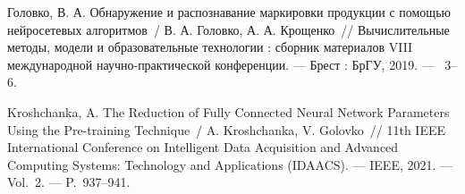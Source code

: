 Головко, В. А. Обнаружение и распознавание маркировки продукции с помощью нейросетевых алгоритмов~/ В. А. Головко, А. А. Крощенко~//
 Вычислительные методы, модели и образовательные технологии : сборник материалов VIII международной научно-практической конференции. ---
\newblock Брест : БрГУ, 2019. ---
~3--6. 

Kroshchanka, A. The Reduction of Fully Connected Neural Network Parameters Using the Pre-training Technique~/ A. Kroshchanka, V. Golovko~//
  11th IEEE International Conference on Intelligent Data Acquisition and Advanced Computing Systems: Technology and Applications (IDAACS). ---
\newblock IEEE, 2021. ---
\newblock Vol.~2. ---
\newblock P.~937--941.





